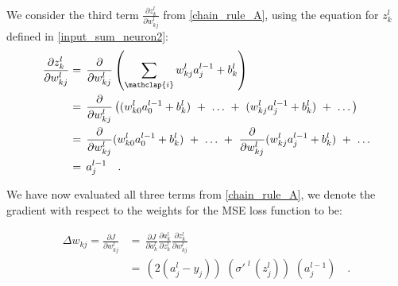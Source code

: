             We consider the third term $\frac{ { \partial z^{l}_{k} } } { { \partial w^{l}_{kj} } }$ from \ref{chain_rule_A}, using the equation for $z^{l}_{k}$ defined in \ref{input_sum_neuron2}:
            \begin{align}
                \frac{ { \partial z^{l}_{k} } } { { \partial w^{l}_{kj} } } 
                    & = \, 
                        \frac{ { \partial } } { { \partial w^{l}_{kj} } } \left( \sum_{\mathclap{i}}^{} w^{l}_{kj} a^{l-1}_{j} + b^{l}_{k} \right) 
                    \nonumber \\
                    & = \, 
                        \frac{ { \partial } } { { \partial w^{l}_{kj} } } 
                        \left( 
                            (w^{l}_{k0} a^{l-1}_{0} + b^{l}_{k}) \, \, + \, \, 
                            \dots \, \, + \, \,
                            (w^{l}_{kj} a^{l-1}_{j} + b^{l}_{k}) \, \, + \, \,
                            \dots
                        \right) 
                    \nonumber \\
                    & = \, 
                        \frac{ { \partial } } { { \partial w^{l}_{kj} } } (w^{l}_{k0} a^{l-1}_{0} + b^{l}_{k}) \, \, + \, \, 
                        \dots \, \, + \, \,
                        \frac{ { \partial } } { { \partial w^{l}_{kj} } } (w^{l}_{kj} a^{l-1}_{j} + b^{l}_{k}) \, \, + \, \,
                        \dots
                    \nonumber \\
                    & = \, 
                        a^{l-1}_{j} \quad .
                    \nonumber \\
            \end{align}
            
            
            We have now evaluated all three terms from \ref{chain_rule_A}, we denote the gradient with respect to the weights for the MSE loss function to be:
            
            \begin{align} \label{eq_weight_gradient}
                \Delta w_{kj} = \frac{ { \partial J } } { { \partial w^{l}_{kj} } }
                & = \,  
                    {
                        { \frac{ { \partial J } } { {  \partial a^{l}_{k} } } }
                        { \frac{ { \partial a^{l}_{k} } } { { \partial z^{l}_{k} } } }
                        { \frac{ { \partial z^{l}_{k} } } { { \partial w^{l}_{kj} } } }
                    }
                \nonumber \\
                & = \,
                    \left( 2(a^{l}_{j} - y_{j}) \right) \,\, \left( \sigma'^{\,\,l}{\,(z^{l}_{j}) } \right) \,\, \left( a^{l-1}_{j} \right) \quad .
            \end{align}
            
